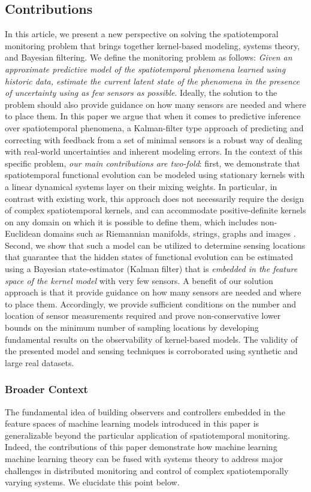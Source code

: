 \subsection{Contributions}
In this article, we present a new perspective on solving the spatiotemporal monitoring problem that brings together kernel-based modeling, systems theory, and Bayesian filtering. We define the monitoring problem as follows: \textit{Given an approximate predictive model of the spatiotemporal phenomena learned using historic data, estimate the current latent state of the phenomena in the presence of uncertainty using as few sensors as possible}. Ideally, the solution to the problem should also provide guidance on how many sensors are needed and where to place them. In this paper we argue that when it comes to predictive inference over spatiotemporal phenomena, a Kalman-filter type approach of predicting and correcting with feedback from a set of minimal sensors is a robust way of dealing with real-world uncertainties and inherent modeling errors.  In the context of this specific problem, \textit{our main contributions are two-fold}: first, we demonstrate that spatiotemporal functional evolution can be modeled using stationary kernels with a linear dynamical systems layer on their mixing weights. In particular, in contrast with existing work, this approach does not necessarily require the design of complex spatiotemporal kernels, and can accommodate positive-definite kernels on any domain on which it is possible to define them, which includes non-Euclidean domains such as Riemannian manifolds, strings, graphs and images \cite{Jayasumana_PAMI2015_RBFs}. Second, we show that such a model can be utilized to determine sensing locations that guarantee that the hidden states of functional evolution can be estimated using a Bayesian state-estimator (Kalman filter) that is \textit{embedded in the feature space of the kernel model} with very few sensors. A benefit of our solution approach is that it provide guidance on how many sensors are needed and where to place them. Accordingly, we provide sufficient conditions on the number and location of sensor measurements required and prove non-conservative lower bounds on the minimum number of sampling locations by developing fundamental results on the observability of kernel-based models. The validity of the presented model and sensing techniques is corroborated using synthetic and large real datasets. 

\subsubsection*{Broader Context}
The fundamental idea of building observers and controllers embedded in the feature spaces of machine learning models introduced in this paper is generalizable beyond the particular application of spatiotemporal monitoring. Indeed, the contributions of this paper demonstrate how machine learning  machine learning theory can be fused with systems theory to address major challenges in distributed monitoring and control of complex spatiotemporally varying systems. We elucidate this point below.

